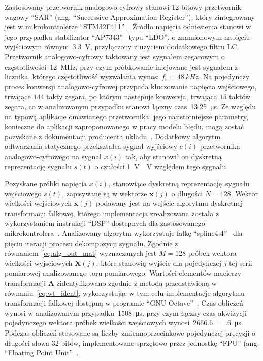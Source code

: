 Zastosowany przetwornik analogowo-cyfrowy stanowi $12$-bitowy przetwornik wagowy \enquote{SAR} (ang. \enquote{Successive Approximation Register}), który zintegrowany jest w mikrokontrolerze \enquote{STM32F411}~\cite{stm_f411}. Źródło napięcia odniesienia stanowi w jego przypadku stabilizator \enquote{AP7343}~\cite{diodes_manual} typu \enquote{LDO}, o znamionowym napięciu wyjściowym równym~\qty{3.3}{V}, przyłączony z użyciem dodatkowego filtru LC. Przetwornik analogowo-cyfrowy taktowany jest sygnałem zegarowym o częstotliwości~\qty{12}{MHz}, przy czym próbkowanie inicjowane jest sygnałem z licznika, którego częstotliwość wyzwalania wynosi $f_{s} = \qty{48}{kHz}$. Na pojedynczy proces konwersji analogowo-cyfrowej przypada kluczowanie napięcia wejściowego, trwające $144$ takty zegara, po którym następuje konwersja, trwająca $15$ taktów zegara, co w analizowanym przypadku stanowi łączny czas~\qty{13.25}{\micro s}. Ze względu na typową aplikacje omawianego przetwornika, jego najistotniejsze parametry, konieczne do aplikacji zaproponowanego w pracy modelu błędu, mogą zostać pozyskane z dokumentacji producenta układu~\cite{stm_f411}. Dodatkowy algorytm odtwarzania statycznego przekształca sygnał wyjściowy $c(i)$ przetwornika analogowo-cyfrowego na sygnał $x(i)$ tak, aby stanowił on dyskretną reprezentację sygnału $s(t)$ o czułości \qty{1}{V \per V} względem tego sygnału.

Pozyskane próbki napięcia $x(i)$, stanowiące dyskretną reprezentację sygnału wejściowego $s(t)$, zapisywane są w wektorze $\mathbf{x}(j)$ o długości $N = 128$. Wektor wielkości wejściowych $\mathbf{x}(j)$ podawany jest na wejście algorytmu dyskretnej transformacji falkowej, którego implementacja zrealizowana została z wykorzystaniem instrukcji \enquote{DSP} dostępnych dla zastosowanego mikrokontrolera~\cite{cortex_dsp, reay_dsp}. Analizowany algorytm wykorzystuje falkę \enquote{spline4:4}~\cite{wang_splinebasics} dla pięciu iteracji procesu dekompozycji sygnału. Zgodnie z równaniem~\eqref{eq:alg_out_mat} wyznaczanych jest $M = 128$ próbek wektora wielkości wyjściowych $\mathbf{X}(j)$, które stanowią wyjście dla pojedynczej $j$-tej serii pomiarowej analizowanego toru pomiarowego. Wartości elementów macierzy transformacji $\mathbf{A}$ zidentyfikowano zgodnie z metodą przedstawioną w równaniu~\eqref{eq:wt_ident}, wykorzystując w tym celu implementacje algorytmu transformacji falkowej dostępną w programie \enquote{GNU Octave}~\cite{pruuvsa_dwt}. Czas obliczeń wynosi w analizowanym przypadku~\qty{1508}{\micro s}, przy czym łączny czas akwizycji pojedynczego wektora próbek wielkości wejściowych wynosi~\qty{2666.6(6)}{\micro s}. Podczas obliczeń stosowane są liczby zmiennoprzecinkowe pojedynczej precyzji o długości słowa $32$-bitów, implementowane sprzętowo przez jednostkę \enquote{FPU} (ang. \enquote{Floating Point Unit}~\cite{cortex_fpu, gcc_manual}.

